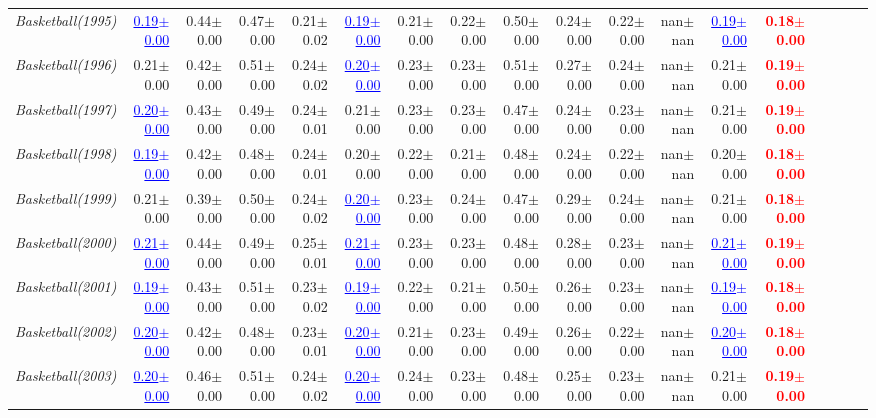 \documentclass[nohyperref]{article}
\theoremstyle{plain}
\theoremstyle{definition}
\theoremstyle{remark}
\newcommand{\red}[1]{\textcolor{red}{\textbf{#1}}}
\newcommand{\blue}[1]{\textcolor{blue}{\underline{#1}}}
\begin{document}
\begin{table*}[!ht]
{\begin{tabular}{lrrrrrrrrrrrrrrrrr}
			{\it Basketball(1995)} & \blue{0.19$\pm$0.00} & 0.44$\pm$0.00 & 0.47$\pm$0.00 & 0.21$\pm$0.02 & \blue{0.19$\pm$0.00} & 0.21$\pm$0.00 & 0.22$\pm$0.00 & 0.50$\pm$0.00 & 0.24$\pm$0.00 & 0.22$\pm$0.00 & nan$\pm$nan & \blue{0.19$\pm$0.00} & \red{0.18$\pm$0.00} \\
			{\it Basketball(1996)} & 0.21$\pm$0.00 & 0.42$\pm$0.00 & 0.51$\pm$0.00 & 0.24$\pm$0.02 & \blue{0.20$\pm$0.00} & 0.23$\pm$0.00 & 0.23$\pm$0.00 & 0.51$\pm$0.00 & 0.27$\pm$0.00 & 0.24$\pm$0.00 & nan$\pm$nan & 0.21$\pm$0.00 & \red{0.19$\pm$0.00} \\
			{\it Basketball(1997)} & \blue{0.20$\pm$0.00} & 0.43$\pm$0.00 & 0.49$\pm$0.00 & 0.24$\pm$0.01 & 0.21$\pm$0.00 & 0.23$\pm$0.00 & 0.23$\pm$0.00 & 0.47$\pm$0.00 & 0.24$\pm$0.00 & 0.23$\pm$0.00 & nan$\pm$nan & 0.21$\pm$0.00 & \red{0.19$\pm$0.00} \\
			{\it Basketball(1998)} & \blue{0.19$\pm$0.00} & 0.42$\pm$0.00 & 0.48$\pm$0.00 & 0.24$\pm$0.01 & 0.20$\pm$0.00 & 0.22$\pm$0.00 & 0.21$\pm$0.00 & 0.48$\pm$0.00 & 0.24$\pm$0.00 & 0.22$\pm$0.00 & nan$\pm$nan & 0.20$\pm$0.00 & \red{0.18$\pm$0.00} \\
			{\it Basketball(1999)} & 0.21$\pm$0.00 & 0.39$\pm$0.00 & 0.50$\pm$0.00 & 0.24$\pm$0.02 & \blue{0.20$\pm$0.00} & 0.23$\pm$0.00 & 0.24$\pm$0.00 & 0.47$\pm$0.00 & 0.29$\pm$0.00 & 0.24$\pm$0.00 & nan$\pm$nan & 0.21$\pm$0.00 & \red{0.18$\pm$0.00} \\
			{\it Basketball(2000)} & \blue{0.21$\pm$0.00} & 0.44$\pm$0.00 & 0.49$\pm$0.00 & 0.25$\pm$0.01 & \blue{0.21$\pm$0.00} & 0.23$\pm$0.00 & 0.23$\pm$0.00 & 0.48$\pm$0.00 & 0.28$\pm$0.00 & 0.23$\pm$0.00 & nan$\pm$nan & \blue{0.21$\pm$0.00} & \red{0.19$\pm$0.00} \\
			{\it Basketball(2001)} & \blue{0.19$\pm$0.00} & 0.43$\pm$0.00 & 0.51$\pm$0.00 & 0.23$\pm$0.02 & \blue{0.19$\pm$0.00} & 0.22$\pm$0.00 & 0.21$\pm$0.00 & 0.50$\pm$0.00 & 0.26$\pm$0.00 & 0.23$\pm$0.00 & nan$\pm$nan & \blue{0.19$\pm$0.00} & \red{0.18$\pm$0.00} \\
			{\it Basketball(2002)} & \blue{0.20$\pm$0.00} & 0.42$\pm$0.00 & 0.48$\pm$0.00 & 0.23$\pm$0.01 & \blue{0.20$\pm$0.00} & 0.21$\pm$0.00 & 0.23$\pm$0.00 & 0.49$\pm$0.00 & 0.26$\pm$0.00 & 0.22$\pm$0.00 & nan$\pm$nan & \blue{0.20$\pm$0.00} & \red{0.18$\pm$0.00} \\
			{\it Basketball(2003)} & \blue{0.20$\pm$0.00} & 0.46$\pm$0.00 & 0.51$\pm$0.00 & 0.24$\pm$0.02 & \blue{0.20$\pm$0.00} & 0.24$\pm$0.00 & 0.23$\pm$0.00 & 0.48$\pm$0.00 & 0.25$\pm$0.00 & 0.23$\pm$0.00 & nan$\pm$nan & 0.21$\pm$0.00 & \red{0.19$\pm$0.00} \\

\end{tabular}}
\end{table*}
\end{document}
